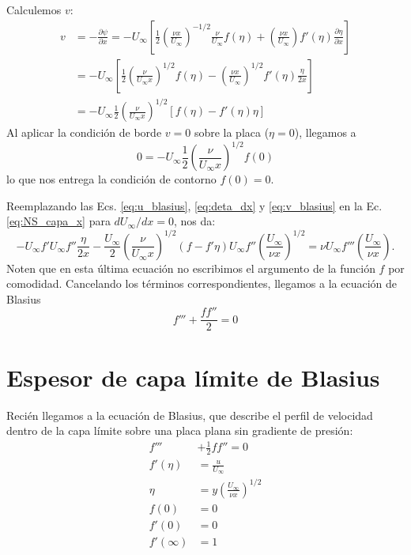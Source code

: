 Calculemos $v$:
%
\begin{align}\label{eq:v_blasius}
v &= -\frac{\partial\psi}{\partial x} = -U_\infty\left[\frac{1}{2}\left(\frac{\nu x}{U_\infty}\right)^{-1/2}\frac{\nu}{U_\infty}f(\eta) + \left(\frac{\nu x}{U_\infty}\right)f'(\eta)\frac{\partial \eta}{\partial x}\right] \nonumber\\
& = -U_\infty\left[\frac{1}{2}\left(\frac{\nu}{U_\infty x}\right)^{1/2} f(\eta) - \left(\frac{\nu x}{U_\infty}\right)^{1/2}f'(\eta)\frac{\eta}{2x}\right] \nonumber\\  
& = -U_\infty\frac{1}{2}\left(\frac{\nu}{U_\infty x}\right)^{1/2} \left[f(\eta) - f'(\eta)\eta\right]
\end{align}
%
Al aplicar la condición de borde $v=0$ sobre la placa ($\eta=0$), llegamos a
%
\begin{equation}
0 = -U_\infty\frac{1}{2}\left(\frac{\nu}{U_\infty x}\right)^{1/2} f(0)
\end{equation}
%
lo que nos entrega la condición de contorno $f(0)=0$.

Reemplazando las Ecs. \eqref{eq:u_blasius}, \eqref{eq:deta_dx} y \eqref{eq:v_blasius} en la Ec. \eqref{eq:NS_capa_x} para $dU_\infty/dx = 0$, nos da:
%
\begin{equation}
-U_\infty f'U_\infty f''\frac{\eta}{2x} - \frac{U_\infty}{2}\left(\frac{\nu}{U_\infty x}\right)^{1/2}(f-f'\eta)U_\infty f''\left(\frac{U_\infty}{\nu x}\right)^{1/2} = \nu U_\infty f'''\left(\frac{U_\infty}{\nu x}\right).
\end{equation}
%
Noten que en esta última ecuación no escribimos el argumento de la función $f$ por comodidad.
Cancelando los términos correspondientes, llegamos a la ecuación de Blasius
%
\begin{equation}
f'''+\frac{ff''}{2}=0
\end{equation}

\section*{Espesor de capa límite de Blasius}

Recién llegamos a la ecuación de Blasius, que describe el perfil de velocidad dentro de la capa límite sobre una placa plana sin gradiente de presión:
 \begin{align}\label{eq:blasius2}
f'''&+\frac{1}{2}ff''=0\nonumber\\
f'(\eta) &= \frac{u}{U_\infty} \nonumber\\
\eta &= y\left(\frac{U_\infty}{\nu x}\right)^{1/2}\nonumber\\
f(0) &= 0\nonumber\\
f'(0) &= 0\nonumber\\
f'(\infty) &= 1
 \end{align}

